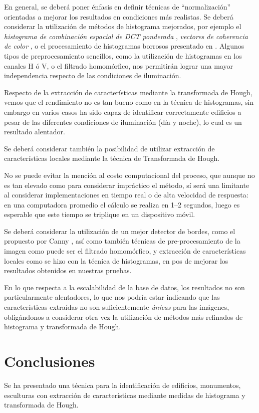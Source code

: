 \documentclass[conference,a4paper,10pt,oneside,final]{tfmpd}
\begin{document}
En general, se deberá poner énfasis en definir técnicas
de ``normalización'' orientadas a mejorar los resultados en condiciones más
realistas. Se deberá considerar la utilización de métodos de histograma
mejorados, por ejemplo el \emph{histograma de combinación espacial de DCT
ponderada} \cite{wdctsch}, \emph{vectores de coherencia de
color} \cite{Pass96histogramrefinement}, o el procesamiento de
histogramas borrosos presentado en \cite{Konstantinidis2005375}.
Algunos tipos de preprocesamiento sencillos, como la utilización de histogramas
en los canales H ó V, o el filtrado homomórfico, nos permitirán lograr una
mayor independencia respecto de las condiciones de iluminación.

Respecto de la extracción de características mediante la transformada de Hough,
vemos que el rendimiento no es tan bueno como en la técnica de histogramas,
sin embargo en varios casos ha sido capaz de identificar correctamente
e\-di\-fi\-cios a pesar de las diferentes condiciones de
iluminación (día y noche), lo cual es un resultado alentador.

Se deberá considerar también la posibilidad de utilizar extracción de
características locales mediante la técnica de Transformada de Hough.

No se puede evitar la mención al costo computacional del proceso, que aunque
no es tan elevado como para considerar impráctico el método, sí será una
limitante al considerar implementaciones en tiempo real o de alta velocidad
de respuesta: en una computadora promedio el cálculo se realiza en 1--2
segundos, luego es esperable que este tiempo se triplique en un
dispositivo móvil.

Se deberá considerar la utilización de un mejor detector de bordes, como el
propuesto por Canny \cite{canny},
así como también técnicas de pre-procesamiento de la
imagen como puede ser el filtrado homomórfico, y extracción de características
locales como se hizo con la técnica de histogramas, en pos de mejorar los
resultados obtenidos en nuestras pruebas.

En lo que respecta a la escalabilidad de la base de datos, los resultados no
son particularmente alentadores, lo que nos {podría estar
indicando que las características extraídas no son suficientemente \emph{únicas}
para las imágenes, obligándonos} a considerar otra vez la
utilización de métodos más refinados de histograma y transformada de Hough.
%
%
%
%
\section{Conclusiones}
Se ha presentado una técnica para la identificación de edificios, monumentos,
esculturas con extracción de características mediante medidas de histograma
y transformada de Hough.
\end{document}
